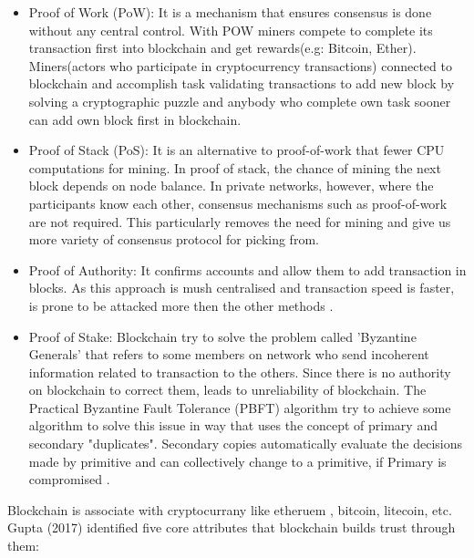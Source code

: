 \begin{itemize}
    \item Proof of Work (PoW): 
    It is a mechanism that ensures consensus is done without any central control. With POW miners compete to complete its transaction first into blockchain and get rewards(e.g: Bitcoin, Ether).\\
    Miners(actors who participate in cryptocurrency transactions) connected to blockchain and accomplish task validating transactions to add new block by solving a cryptographic puzzle and anybody who complete own task sooner can add own block first in blockchain\cite{Pablo}.
    \item Proof of Stack (PoS): 
    It is an alternative to proof-of-work that fewer CPU computations for mining. In proof of stack, the chance of mining the next block depends on node balance. 
    In private networks, however, where the participants know each other, consensus mechanisms such as proof-of-work are not required. This particularly removes the need for mining and give us more variety of consensus protocol for picking from\cite{Christidis}.
    \item Proof of Authority: It confirms accounts and allow them to add transaction in blocks. As this approach is mush centralised and transaction speed is faster, is prone to be attacked more then the other methods \cite{Luke}.
    \item Proof of Stake: Blockchain try to solve the problem called 'Byzantine Generals' that refers to some members on network who send incoherent information related to transaction to the others. Since there is no authority on blockchain to correct them, leads to unreliability of blockchain. The Practical Byzantine Fault Tolerance (PBFT) algorithm try to achieve some algorithm to solve this issue in  way that uses the concept of primary and secondary "duplicates". Secondary copies automatically evaluate the decisions made by primitive and can collectively change to a primitive, if Primary is compromised \cite{Luke}.
\end{itemize}
Blockchain is associate with cryptocurrany like etheruem , bitcoin, litecoin, etc. Gupta (2017) identified five core attributes that blockchain builds trust through them:
